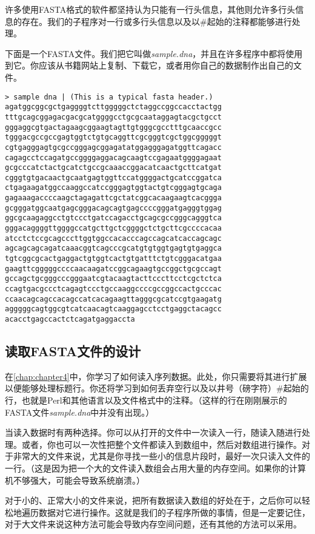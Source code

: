 许多使用FASTA格式的软件都坚持认为只能有一行头信息，其他则允许多行头信息的存在。我们的子程序对一行或多行头信息以及以\#起始的注释都能够进行处理。

下面是一个FASTA文件。我们把它叫做\textit{sample.dna}，并且在许多程序中都将使用到它。你应该从书籍网站上复制、下载它，或者用你自己的数据制作出自己的文件。

\begin{lstlisting}
> sample dna | (This is a typical fasta header.)
agatggcggcgctgaggggtcttgggggctctaggccggccacctactgg
tttgcagcggagacgacgcatggggcctgcgcaataggagtacgctgcct
gggaggcgtgactagaagcggaagtagttgtgggcgcctttgcaaccgcc
tgggacgccgccgagtggtctgtgcaggttcgcgggtcgctggcgggggt
cgtgagggagtgcgccgggagcggagatatggagggagatggttcagacc
cagagcctccagatgccggggaggacagcaagtccgagaatggggagaat
gcgcccatctactgcatctgccgcaaaccggacatcaactgcttcatgat
cgggtgtgacaactgcaatgagtggttccatggggactgcatccggatca
ctgagaagatggccaaggccatccgggagtggtactgtcgggagtgcaga
gagaaagaccccaagctagagattcgctatcggcacaagaagtcacggga
gcgggatggcaatgagcgggacagcagtgagccccgggatgagggtggag
ggcgcaagaggcctgtccctgatccagacctgcagcgccgggcagggtca
gggacaggggttggggccatgcttgctcggggctctgcttcgccccacaa
atcctctccgcagcccttggtggccacacccagccagcatcaccagcagc
agcagcagcagatcaaacggtcagcccgcatgtgtggtgagtgtgaggca
tgtcggcgcactgaggactgtggtcactgtgatttctgtcgggacatgaa
gaagttcgggggccccaacaagatccggcagaagtgccggctgcgccagt
gccagctgcgggcccgggaatcgtacaagtacttcccttcctcgctctca
ccagtgacgccctcagagtccctgccaaggccccgccggccactgcccac
ccaacagcagccacagccatcacagaagttagggcgcatccgtgaagatg
agggggcagtggcgtcatcaacagtcaaggagcctcctgaggctacagcc
acacctgagccactctcagatgaggaccta
\end{lstlisting}

\subsection{读取FASTA文件的设计}
在\autoref{chap:chapter4}中，你学习了如何读入序列数据。此处，你只需要将其进行扩展以便能够处理标题行。你还将学习到如何丢弃空行以及以井号（磅字符）\#起始的行，也就是Perl和其他语言以及文件格式中的注释。（这样的行在刚刚展示的FASTA文件\textit{sample.dna}中并没有出现。）

当读入数据时有两种选择。你可以从打开的文件中一次读入一行，随读入随进行处理。或者，你也可以一次性把整个文件都读入到数组中，然后对数组进行操作。对于非常大的文件来说，尤其是你寻找一些小的信息片段时，最好一次只读入文件的一行。（这是因为把一个大的文件读入数组会占用大量的内存空间。如果你的计算机不够强大，可能会导致系统崩溃。）

对于小的、正常大小的文件来说，把所有数据读入数组的好处在于，之后你可以轻松地遍历数据对它进行操作。这就是我们的子程序所做的事情，但是一定要记住，对于大文件来说这种方法可能会导致内存空间问题，还有其他的方法可以采用。

